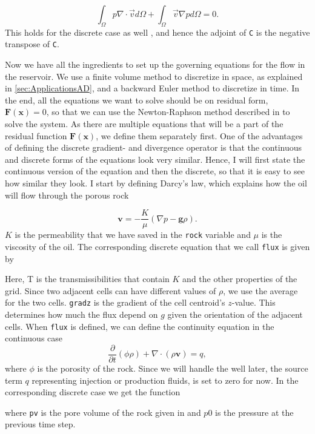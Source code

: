 \begin{equation*}
    \int_\Omega p\nabla \cdot \vec{v} d\Omega + \int_\Omega \vec{v}\nabla p d\Omega = 0.
\end{equation*}
This holds for the discrete case as well \emph{\citep{lieMrstUrl}}, and hence the adjoint of \texttt{C} is the negative transpose of \texttt{C}.


Now we have all the ingredients to set up the governing equations for the flow in the reservoir. We use a finite volume method to discretize in space, as explained in \autoref{sec:ApplicationsAD}, and a backward Euler method to discretize in time. In the end, all the equations we want to solve should be on residual form, $\boldsymbol{F}(\boldsymbol{x}) = 0$, so that we can use the Newton-Raphson method described in  to solve the system. As there are multiple equations that will be a part of the residual function $\boldsymbol{F}(\boldsymbol{x})$, we define them separately first. One of the advantages of defining the discrete gradient- and divergence operator is that the continuous and discrete forms of the equations look very similar. Hence, I will first state the continuous version of the equation and then the discrete, so that it is easy to see how similar they look. I start by defining Darcy's law, which explains how the oil will flow through the porous rock

\begin{equation}
    \textbf{v} = - \frac{K}{\mu}(\nabla p - \textbf{g}\rho).
    \label{eq:pressSolverDarcy}
\end{equation}
$K$ is the permeability that we have saved in the \texttt{rock} variable and $\mu$ is the viscosity of the oil.
The corresponding discrete equation that we call \texttt{flux} is given by 

Here, T is the transmissibilities that contain $K$ and the other properties of the grid. Since two adjacent cells can have different values of $\rho$, we use the  average for the two cells. \texttt{gradz} is the gradient of the cell centroid's $z$-value. This determines how much the flux depend on $g$ given the orientation of the adjacent cells. When \texttt{flux} is defined, we can define the continuity equation in the continuous case
\begin{equation}
    \frac{\partial}{\partial t}(\phi\rho) + \nabla\cdot(\rho\textbf{v}) = q,
    \label{eq:continuityEqPressure}
\end{equation}
where $\phi$ is the porosity of the rock. Since we will handle the well later, the source term $q$ representing injection or production fluids, is set to zero for now. In the corresponding discrete case we get the function

where \texttt{pv} is the pore volume of the rock given in  and $p0$ is the pressure at the previous time step. 

